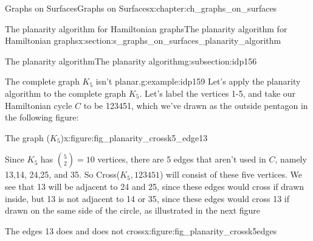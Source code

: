 \documentclass[oneside,10pt,]{book}
\numberwithin{equation}{section}
\begin{document}
\begin{chapterptx}{Graphs on Surfaces}{}{Graphs on Surfaces}{}{}{x:chapter:ch_graphs_on_surfaces}
\begin{sectionptx}{The planarity algorithm for Hamiltonian graphs}{}{The planarity algorithm for Hamiltonian graphs}{}{}{x:section:s_graphs_on_surfaces_planarity_algorithm}
\begin{subsectionptx}{The planarity algorithm}{}{The planarity algorithm}{}{}{g:subsection:idp156}
\begin{example}{The complete graph \(K_5\) isn't planar.}{g:example:idp159}%
Let's apply the planarity algorithm to the complete graph \(K_5\).  Let's label the vertices 1-5, and take our Hamiltonian cycle \(C\) to be 123451, which we've drawn as the outside pentagon in the following figure: \begin{figureptx}{The graph (\(K_5\))}{x:figure:fig_planarity_crossk5_edge13}{}%
\begin{image}{0.15}{0.7}{0.15}%
%
\end{image}%
\tcblower
\end{figureptx}%
 Since \(K_5\) has \(\binom{5}{2}=10\) vertices, there are 5 edges that aren't used in \(C\), namely 13,14, 24,25, and 35.  So Cross(\(K_5, 123451\)) will consist of these five vertices.  We see that 13 will be adjacent to 24 and 25, since these edges would cross if drawn inside, but 13 is not adjacent to 14 or 35, since these edges would cross 13 if drawn on the same side of the circle, as illustrated in the next figure%
\begin{figureptx}{The edges 13 does and does not cross}{x:figure:fig_planarity_crossk5edges}{}%
\begin{image}{0.15}{0.7}{0.15}%
\end{image}
\end{figureptx}
\end{example}
\end{subsectionptx}
\end{sectionptx}
\end{chapterptx}
\end{document}
